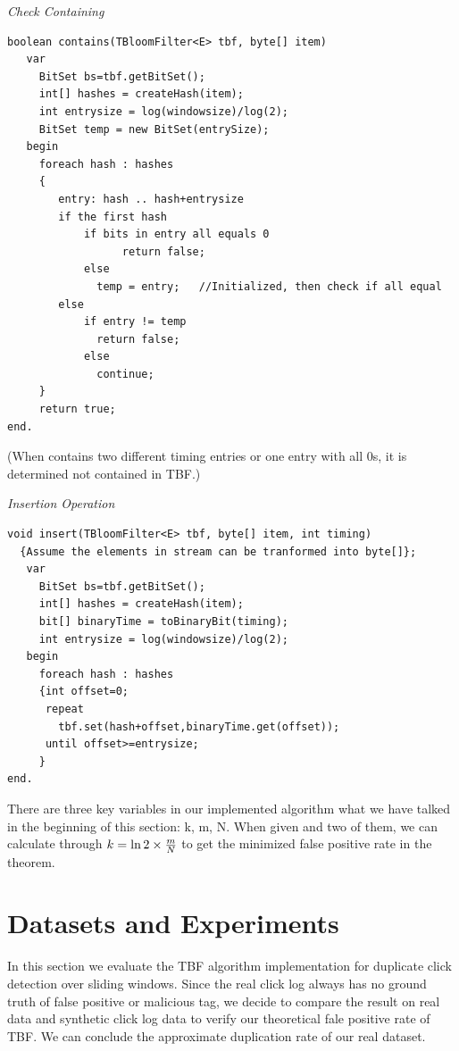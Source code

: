 \documentclass[runningheads,report]{llncs}
\begin{document}
\medskip

{\it Check Containing}
\begin{verbatim}
boolean contains(TBloomFilter<E> tbf, byte[] item)
   var
     BitSet bs=tbf.getBitSet();  
     int[] hashes = createHash(item);
     int entrysize = log(windowsize)/log(2);  
     BitSet temp = new BitSet(entrySize); 
   begin 
     foreach hash : hashes
     {
     	entry: hash .. hash+entrysize
     	if the first hash
     	    if bits in entry all equals 0
     		      return false;
     	    else 
     	      temp = entry;   //Initialized, then check if all equal 
     	else
     	    if entry != temp
     	      return false;
     	    else
     	      continue;		
     }
     return true;
end.
\end{verbatim}
\begin{small}
(When contains two different timing entries or one entry with all 0s, it is determined not contained in TBF.)
\end{small}
%

\medskip

\noindent
{\it Insertion Operation}
\begin{verbatim}
void insert(TBloomFilter<E> tbf, byte[] item, int timing)
  {Assume the elements in stream can be tranformed into byte[]};
   var
     BitSet bs=tbf.getBitSet();  
     int[] hashes = createHash(item);
     bit[] binaryTime = toBinaryBit(timing);
     int entrysize = log(windowsize)/log(2); 
   begin 
     foreach hash : hashes
     {int offset=0;
      repeat
      	tbf.set(hash+offset,binaryTime.get(offset));
      until offset>=entrysize;
     }
end.
\end{verbatim}

%
\noindent

There are three key variables in our implemented algorithm what we have talked in the beginning of this section: k, m, N. When given and two of them, we can calculate through $k = \ln 2 \times {m \over N}$ to get the minimized false positive rate in the theorem.


\section{Datasets and Experiments}

In this section we evaluate the TBF algorithm implementation for duplicate click detection over sliding windows. Since the real click log always has no ground truth of false positive or malicious tag, we decide to compare the result on real data and synthetic click log data to verify our theoretical fale positive rate of TBF. We can conclude the approximate duplication rate of our real dataset.
\end{document}
